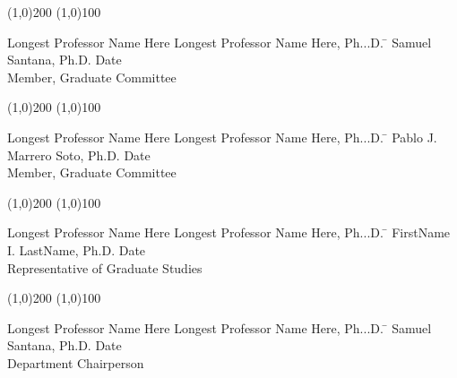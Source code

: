 \noindent
\line(1,0){200} \hspace{40 mm} \line(1,0){100}\\
\noindent
\vspace{-1.75\baselineskip}
\begin{tabbing}
	Longest Professor Name Here Longest Professor Name Here, Ph...D. \=  \kill
	Samuel Santana, Ph.D. \>  Date\\Member, Graduate Committee  %
\end{tabbing}

\noindent
\line(1,0){200} \hspace{40 mm} \line(1,0){100}\\
\noindent
\vspace{-1.75\baselineskip}
\begin{tabbing}
	Longest Professor Name Here Longest Professor Name Here, Ph...D.   \=  \kill
	Pablo J. Marrero Soto, Ph.D. \>  Date\\Member, Graduate Committee %
\end{tabbing}



\noindent
\line(1,0){200} \hspace{40 mm} \line(1,0){100}\\
\noindent
\vspace{-1.75\baselineskip}
\begin{tabbing}
	Longest Professor Name Here Longest Professor Name Here, Ph...D.  \=  \kill
	FirstName I. LastName, Ph.D. \>  Date\\Representative of Graduate Studies  %
\end{tabbing}


\noindent
\line(1,0){200} \hspace{40 mm} \line(1,0){100}\\
\noindent
\vspace{-1.75\baselineskip}
\begin{tabbing}
	Longest Professor Name Here Longest Professor Name Here, Ph...D.  \=  \kill
	Samuel Santana, Ph.D. \>  Date\\Department Chairperson  %
\end{tabbing}
